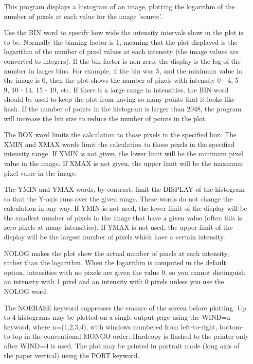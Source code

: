 This program displays a histogram of an image, plotting the logarithm of
the number of pixels at each value for the image 'source'.

Use the BIN word to specify how wide the intensity intervals show in the
plot is to be.  Normally the binning factor is 1, meaning that the plot
displayed is the logarithm of the number of pixel values at each intensity
(the image values are converted to integers).  If the bin factor is
non-zero, the display is the log of the number in larger bins.  For
example, if the bin was 5, and the minimum value in the image is 0, then
the plot shows the number of pixels with intensity 0 - 4, 5 - 9, 10 - 14,
15 - 19, etc. If there is a large range in intensities, the BIN word should
be used to keep the plot from having so many points that it looks like
hash. If the number of points in the histogram is larger than 2048, the
program will increase the bin size to reduce the number of points in the
plot.

The BOX word limits the calculation to those pixels in the specified box.
The XMIN and XMAX words limit the calculation to those pixels in the
specified intensity range.  If XMIN is not given, the lower limit will be
the minimum pixel value in the image.  If XMAX is not given, the upper
limit will be the maximum pixel value in the image.

The YMIN and YMAX words, by contrast, limit the DISPLAY of the histogram so
that the Y-axis runs over the given range.  These words do not change the
calculation in any way.  If YMIN is not used, the lower limit of the
display will be the smallest number of pixels in the image that have a
given value (often this is zero pixels at many intensities).  If YMAX is
not used, the upper limit of the display will be the largest number of
pixels which have a certain intensity.
       
NOLOG makes the plot show the actual number of pixels at each intensity,
rather than the logarithm.  When the logarithm is computed in the default
option, intensities with no pixels are given the value 0, so you cannot
distinguish an intensity with 1 pixel and an intensity with 0 pixels unless
you use the NOLOG word.

The NOERASE keyword suppresses the erasure of the screen before plotting.
Up to 4 histograms may be plotted on a single output page using the WIND=n
keyword, where n=(1,2,3,4), with windows numbered from left-to-right,
bottom-to-top in the conventional MONGO order.  Hardcopy is flushed to the
printer only after WIND=4 is used.  The plot may be printed in portrait
mode (long axis of the paper vertical) using the PORT keyword.

